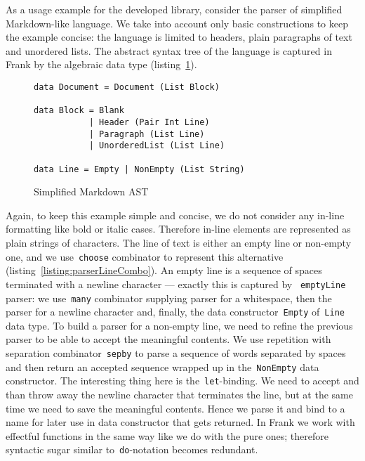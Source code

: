     As a usage example for the developed library, consider the
    parser of simplified Markdown-like language. We take into account only basic
    constructions to keep the example concise: the language is limited to headers,
    plain paragraphs of text and unordered lists. The abstract syntax tree of
    the language is captured in Frank by the algebraic data type
    (listing~\ref{listing:parserMdAstCombo}).

      \begin{figure}[h]
      \begin{lstlisting}
data Document = Document (List Block)

data Block = Blank
           | Header (Pair Int Line)
           | Paragraph (List Line)
           | UnorderedList (List Line)

data Line = Empty | NonEmpty (List String)
      \end{lstlisting}
      \caption{Simplified Markdown AST}
      \label{listing:parserMdAstCombo}
      \end{figure}

      Again, to keep this example simple and concise, we do not consider any in-line
      formatting like bold or italic cases. Therefore in-line elements are represented
      as plain strings of characters. The line of text is either an empty line or
      non-empty one, and we use~\texttt{choose} combinator to represent this
      alternative (listing~\ref{listing:parserLineCombo}). An empty line is a sequence of
      spaces terminated with a newline character --- exactly this is captured by
      ~\texttt{emptyLine} parser: we use~\texttt{many} combinator supplying parser
      for a whitespace, then the parser for a newline character and, finally, the
      data constructor~\texttt{Empty} of~\texttt{Line} data type. To build a parser for
      a non-empty line, we need to refine the previous parser to be able to accept the
      meaningful contents. We use repetition with separation combinator~\texttt{sepby}
      to parse a sequence of words separated by spaces and then return an accepted sequence
      wrapped up in the~\texttt{NonEmpty} data constructor. The interesting
      thing here is the~\texttt{let}-binding. We need to accept and than throw away
      the newline character that terminates the line, but at the same time we need to save
      the meaningful contents. Hence we parse it and bind to a name for later use in
      data constructor that gets returned. In Frank we work with
      effectful functions in the same way like we do with the pure ones; therefore
      syntactic sugar similar to~\texttt{do}-notation becomes redundant.

